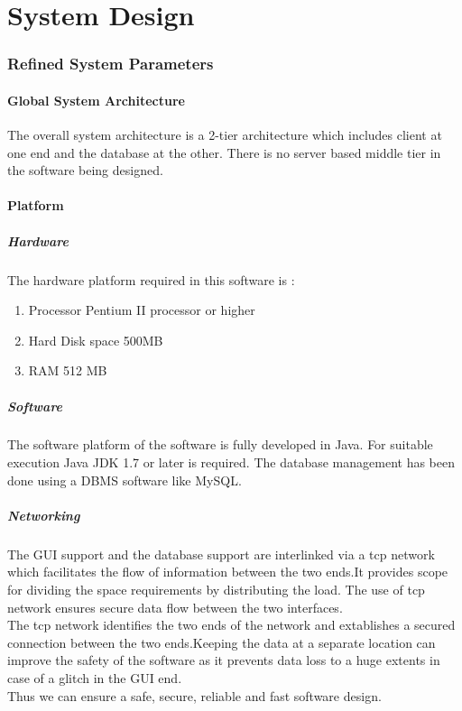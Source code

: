 \documentclass[a4paper]{article}
\begin{document}
\part{System Design}
\section{Refined System Parameters}
\subsection{Global System Architecture}
The overall system architecture is a 2-tier architecture which includes client at one end and the
database at the other. There is no server based middle tier in the software being designed.
\subsection{Platform}
\subsubsection{Hardware}
The hardware platform required in this software is :
\begin {enumerate}
	\item Processor Pentium II processor or higher
	\item Hard Disk space 500MB
	\item RAM 512 MB
	\end{enumerate}
\subsubsection{Software}
The software platform of the software is fully developed in Java.
For suitable execution Java JDK 1.7 or later is required.
The database management has been done using a DBMS software like MySQL.

\subsubsection{Networking}
The GUI support and the database support are interlinked via a tcp network which facilitates the flow of information between the two ends.It provides scope for dividing the space requirements by distributing the load. The use of tcp network ensures secure data flow between the two interfaces.\\
The tcp network identifies the two ends of the network and extablishes a secured connection between the two ends.Keeping the data at a separate location can improve the safety of the software as it prevents data loss to a huge extents in case of a glitch in the GUI end.
\\
Thus we can ensure a safe, secure, reliable and fast software design.
\end{document}
